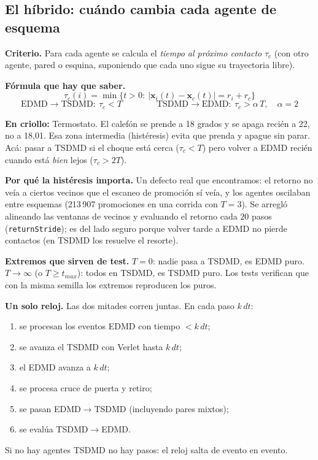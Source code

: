 \documentclass[10.5pt,a4paper]{article}
\newcommand{\vect}[1]{\mathbf{#1}}
\newcommand{\analogia}[1]{\par\colorbox{ana}{\parbox{\dimexpr\linewidth-2\fboxsep}{\textbf{En criollo:} #1}}\par}
\newcommand{\formula}[1]{\par\colorbox{fml}{\parbox{\dimexpr\linewidth-2\fboxsep}{\textbf{Fórmula que hay que saber.} #1}}\par}
\begin{document}
\subsection{El híbrido: cuándo cambia cada agente de esquema}
\textbf{Criterio.} Para cada agente se calcula el \emph{tiempo al próximo contacto} $\tau_c$ (con otro agente, pared o esquina, suponiendo que cada uno sigue su trayectoria libre).
\formula{
\[
\tau_c(i)=\min\bigl\{t>0:\ |\vect x_i(t)-\vect x_c(t)|=r_i+r_c\bigr\}
\]
\[
\text{EDMD}\to\text{TSDMD}:\ \tau_c<T
\qquad\qquad
\text{TSDMD}\to\text{EDMD}:\ \tau_c>\alpha\,T,\quad\alpha=2
\]}
\begin{center}
\end{center}
\analogia{Termostato. El calefón se prende a 18 grados y se apaga recién a 22, no a 18,01. Esa zona intermedia (histéresis) evita que prenda y apague sin parar. Acá: pasar a TSDMD si el choque está cerca ($\tau_c<T$) pero volver a EDMD recién cuando está \emph{bien} lejos ($\tau_c>2T$).}
\textbf{Por qué la histéresis importa.} Un defecto real que encontramos: el retorno no veía a ciertos vecinos que el escaneo de promoción sí veía, y los agentes oscilaban entre esquemas (213\,907 promociones en una corrida con $T=3$). Se arregló alineando las ventanas de vecinos y evaluando el retorno cada $20$ pasos (\texttt{returnStride}); es del lado seguro porque volver tarde a EDMD no pierde contactos (en TSDMD los resuelve el resorte).

\textbf{Extremos que sirven de test.} $T=0$: nadie pasa a TSDMD, es EDMD puro. $T\to\infty$ (o $T\geq t_{max}$): todos en TSDMD, es TSDMD puro. Los tests verifican que con la misma semilla los extremos reproducen los puros.

\textbf{Un solo reloj.} Las dos mitades corren juntas. En cada paso $k\,dt$:
\begin{enumerate}
\item se procesan los eventos EDMD con tiempo $<k\,dt$;
\item se avanza el TSDMD con Verlet hasta $k\,dt$;
\item el EDMD avanza a $k\,dt$;
\item se procesa cruce de puerta y retiro;
\item se pasan EDMD$\to$TSDMD (incluyendo pares mixtos);
\item se evalúa TSDMD$\to$EDMD.
\end{enumerate}
Si no hay agentes TSDMD no hay pasos: el reloj salta de evento en evento.
\end{document}
